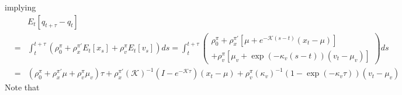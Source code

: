 \documentclass{article}
\begin{document}
implying%
\begin{eqnarray*}
&&E_{t}\left[ q_{t+\tau }-q_{t}\right]  \\
&=&\int_{t}^{t+\tau }\left( \rho _{0}^{\pi }+\rho _{x}^{\pi \prime }E_{t}
\left[ x_{s}\right] +\rho _{v}^{\pi }E_{t}\left[ v_{s}\right] \right)
ds=\int_{t}^{t+\tau }\left( 
\begin{array}{c}
\rho _{0}^{\pi }+\rho _{x}^{\pi \prime }\left[ \mu +e^{-\mathcal{K}\left(
s-t\right) }\left( x_{t}-\mu \right) \right]  \\ 
+\rho _{v}^{\pi }\left[ \mu _{v}+\exp \left( -\kappa _{v}\left( s-t\right)
\right) \left( v_{t}-\mu _{v}\right) \right] 
\end{array}%
\right) ds \\
&=&\left( \rho _{0}^{\pi }+\rho _{x}^{\pi \prime }\mu +\rho _{v}^{\pi }\mu
_{v}\right) \tau +\rho _{x}^{\pi \prime }\left( \mathcal{K}\right)
^{-1}\left( I-e^{-\mathcal{K}\tau }\right) \left( x_{t}-\mu \right) +\rho
_{v}^{\pi }\left( \kappa _{v}\right) ^{-1}\left( 1-\exp \left( -\kappa
_{v}\tau \right) \right) \left( v_{t}-\mu _{v}\right) 
\end{eqnarray*}%
Note that%
\end{document}
